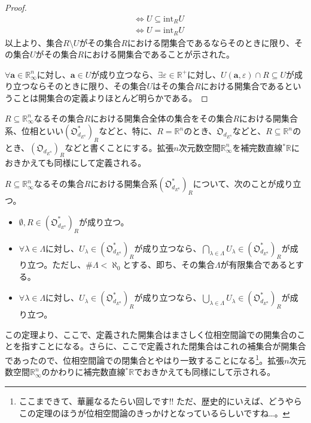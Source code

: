 \documentclass[dvipdfmx]{jsarticle}
\begin{document}
\begin{proof}
\begin{align*}
&\Leftrightarrow U \subseteq \mathrm{int}_{R}U\\
&\Leftrightarrow U = \mathrm{int}_{R}U
\end{align*}
以上より、集合$R \setminus U$がその集合$R$における閉集合であるならそのときに限り、その集合$U$がその集合$R$における開集合であることが示された。\par
$\forall\mathbf{a} \in \mathbb{R}_{\infty}^{n}$に対し、$\mathbf{a} \in U$が成り立つなら、$\exists\varepsilon \in \mathbb{R}^{+}$に対し、$U\left( \mathbf{a},\varepsilon \right) \cap R \subseteq U$が成り立つならそのときに限り、その集合$U$はその集合$R$における開集合であるということは開集合の定義よりほとんど明らかである。
\end{proof}
\begin{dfn}
$R \subseteq \mathbb{R}_{\infty}^{n}$なるその集合$R$における開集合全体の集合をその集合$R$における開集合系、位相といい$\left( \mathfrak{O}_{d_{E^{n}}}^{*} \right)_{R}$などと、特に、$R = \mathbb{R}^{n}$のとき、$\mathfrak{O}_{d_{E^{n}}}$などと、$R \subseteq \mathbb{R}^{n}$のとき、$\left( \mathfrak{O}_{d_{E^{n}}} \right)_{R}$などと書くことにする。拡張$n$次元数空間$\mathbb{R}_{\infty}^{n}$を補完数直線${}^{*}\mathbb{R}$におきかえても同様にして定義される。
\end{dfn}
\begin{thm}\label{4.1.3.13}
$R \subseteq \mathbb{R}_{\infty}^{n}$なるその集合$R$における開集合系$\left( \mathfrak{O}_{d_{E^{n}}}^{*} \right)_{R}$について、次のことが成り立つ。
\begin{itemize}
\item
  $\emptyset,R \in \left( \mathfrak{O}_{d_{E^{n}}}^{*} \right)_{R}$が成り立つ。
\item
  $\forall\lambda \in \varLambda$に対し、$U_{\lambda} \in \left( \mathfrak{O}_{d_{E^{n}}}^{*} \right)_{R}$が成り立つなら、$\bigcap_{ \lambda \in \varLambda } U_{\lambda} \in \left( \mathfrak{O}_{d_{E^{n}}}^{*} \right)_{R}$が成り立つ。ただし、$\#\varLambda < \aleph_{0}$とする、即ち、その集合$\varLambda$が有限集合であるとする。
\item
  $\forall\lambda \in \varLambda$に対し、$U_{\lambda} \in \left( \mathfrak{O}_{d_{E^{n}}}^{*} \right)_{R}$が成り立つなら、$\bigcup_{\lambda \in \varLambda} U_{\lambda} \in \left( \mathfrak{O}_{d_{E^{n}}}^{*} \right)_{R}$が成り立つ。
\end{itemize}
\end{thm}\par
この定理より、ここで、定義された開集合はまさしく位相空間論での開集合のことを指すことになる。さらに、ここで定義された閉集合はこれの補集合が開集合であったので、位相空間論での閉集合とやはり一致することになる\footnote{ここまできて、華麗なるたらい回しです!! ただ、歴史的にいえば、どうやらこの定理のほうが位相空間論のきっかけとなっているらしいですね…。}。拡張$n$次元数空間$\mathbb{R}_{\infty}^{n}$のかわりに補完数直線${}^{*}\mathbb{R}$でおきかえても同様にして示される。
\end{document}
